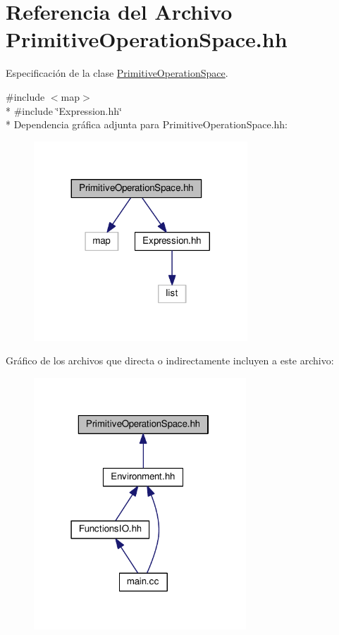 \hypertarget{_primitive_operation_space_8hh}{}\section{Referencia del Archivo Primitive\+Operation\+Space.\+hh}
\label{_primitive_operation_space_8hh}


Especificación de la clase \hyperlink{class_primitive_operation_space}{Primitive\+Operation\+Space}.  


{\ttfamily \#include $<$map$>$}\\*
{\ttfamily \#include \char`\"{}Expression.\+hh\char`\"{}}\\*
Dependencia gráfica adjunta para Primitive\+Operation\+Space.\+hh\+:\nopagebreak
\begin{figure}[H]
\begin{center}
\leavevmode
\includegraphics[width=227pt]{_primitive_operation_space_8hh__incl}
\end{center}
\end{figure}
Gráfico de los archivos que directa o indirectamente incluyen a este archivo\+:\nopagebreak
\begin{figure}[H]
\begin{center}
\leavevmode
\includegraphics[width=226pt]{_primitive_operation_space_8hh__dep__incl}
\end{center}
\end{figure}
